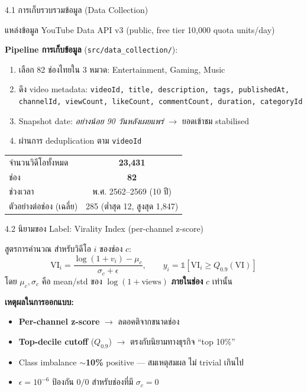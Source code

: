 \documentclass[aspectratio=169,11pt,xcolor=dvipsnames]{beamer}
\newcommand{\hl}[1]{\textcolor{kmitlOrange}{\textbf{#1}}}
\begin{document}
\begin{frame}[shrink=8]{4.1 การเก็บรวบรวมข้อมูล (Data Collection)}
  \begin{block}{แหล่งข้อมูล}
    YouTube Data API v3 (public, free tier 10{,}000 quota units/day)
  \end{block}
  \textbf{Pipeline การเก็บข้อมูล} (\texttt{src/data\_collection/}):
  \begin{enumerate}
    \item เลือก 82 ช่องไทยใน 3 หมวด: Entertainment, Gaming, Music
    \item ดึง video metadata: \texttt{videoId, title, description, tags, publishedAt, channelId, viewCount, likeCount, commentCount, duration, categoryId}
    \item Snapshot date: \emph{อย่างน้อย 90 วันหลังเผยแพร่} $\rightarrow$ ยอดเข้าชม stabilised
    \item ผ่านการ deduplication ตาม \texttt{videoId}
  \end{enumerate}
  \vspace{0.4em}
  \begin{center}
    \begin{tabular}{lc}
      \toprule
      จำนวนวิดีโอทั้งหมด & \hl{23{,}431}\\
      ช่อง & \hl{82}\\
      ช่วงเวลา & พ.ศ. 2562--2569 (10 ปี)\\
      ตัวอย่างต่อช่อง (เฉลี่ย) & 285 (ต่ำสุด 12, สูงสุด 1{,}847)\\
      \bottomrule
    \end{tabular}
  \end{center}
\end{frame}

\begin{frame}{4.2 นิยามของ Label: Virality Index (per-channel z-score)}
  \begin{block}{สูตรการคำนวณ}
    สำหรับวิดีโอ $i$ ของช่อง $c$:
    \[
      \text{VI}_i = \frac{\log(1 + v_i) - \mu_c}{\sigma_c + \epsilon}
      , \qquad
      y_i = \mathbb{1}\!\left[\text{VI}_i \geq Q_{0.9}(\text{VI})\right]
    \]
    โดย $\mu_c, \sigma_c$ คือ mean/std ของ $\log(1+\text{views})$ \hl{ภายในช่อง} $c$ เท่านั้น
  \end{block}

  \textbf{เหตุผลในการออกแบบ:}
  \begin{itemize}
    \item \hl{Per-channel z-score} $\rightarrow$ ลดอคติจากขนาดช่อง
    \item \hl{Top-decile cutoff} ($Q_{0.9}$) $\rightarrow$ ตรงกับนิยามทางธุรกิจ ``top 10\%''
    \item Class imbalance \hl{$\sim$10\%} positive — สมเหตุสมผล ไม่ trivial เกินไป
    \item $\epsilon = 10^{-6}$ ป้องกัน $0/0$ สำหรับช่องที่มี $\sigma_c = 0$
  \end{itemize}
\end{frame}
\end{document}

